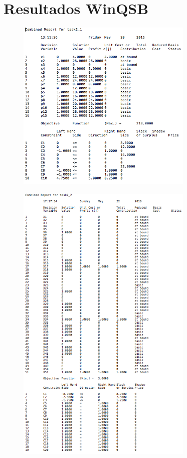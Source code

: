\documentclass[10pt, a4paper]{article}
\begin{document}
	\section{Resultados WinQSB}

		\begin{figure}[H]
		\centering
			\includegraphics[width=0.75\textwidth]{res/exercise-1-result.png}
		\end{figure}

		\begin{figure}[H]
		\centering
			\includegraphics[width=0.75\textwidth]{res/exercise-2-result.png}
		\end{figure}
\end{document}
